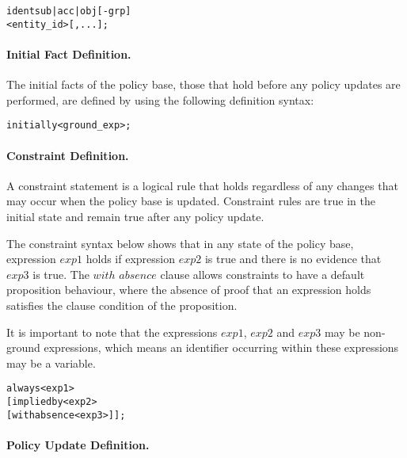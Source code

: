 \documentclass[glov2,twocolumn,final]{svjour2}
\newenvironment{vverbatim}
  {\begin{alltt}}
  {\vspace{-\baselineskip}\end{alltt}}
\begin{document}
          \begin{vverbatim}
  ident sub|acc|obj[-grp]
    <entity\_id>[, ...];
          \end{vverbatim}

        \paragraph{Initial Fact Definition.}

          The initial facts of the policy base, those that hold before any
          policy updates are performed, are defined by using the following
          definition syntax:

          \begin{vverbatim}
  initially <ground\_exp>;
          \end{vverbatim}

        \paragraph{Constraint Definition.}

          A constraint statement is a logical rule that holds regardless of any
          changes that may occur when the policy base is updated. Constraint
          rules are true in the initial state and remain true after any policy
          update.

          The constraint syntax below shows that in any state of the policy
          base, expression $exp1$ holds if expression $exp2$ is true and there
          is no evidence that $exp3$ is true. The $with$ $absence$ clause
          allows constraints to have a default proposition behaviour, where
          the absence of proof that an expression holds  satisfies the clause
          condition of the proposition.

          It is important to note that the expressions $exp1$, $exp2$ and
          $exp3$ may be non-ground expressions, which means an identifier
          occurring within these expressions may be a variable.

          \begin{vverbatim}
  always <exp1>
    [implied by <exp2>
    [with absence <exp3>]];
          \end{vverbatim}

        \paragraph{Policy Update Definition.}
\end{document}
